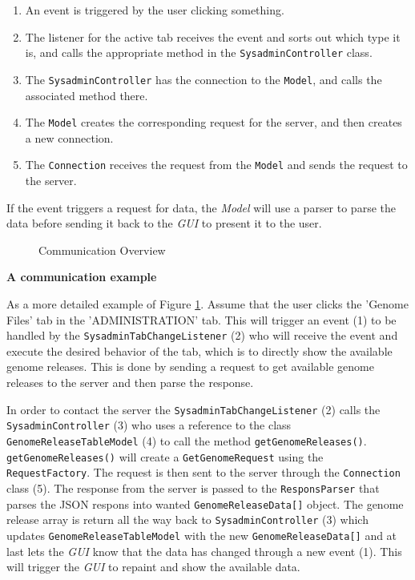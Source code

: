 \begin{enumerate}

  \item An event is triggered by the user clicking something.
  \item The listener for the active tab receives the event and sorts out which type it is, and calls the appropriate method in the \texttt{SysadminController} class.
  \item The \texttt{SysadminController} has the connection to the \texttt{Model}, and calls the associated method there.
  \item The \texttt{Model} creates the corresponding request for the server, and then creates a new connection.
  \item The \texttt{Connection} receives the request from the \texttt{Model} and sends the request to the server.


\end{enumerate}

If the event triggers a request for data, the \textit{Model} will use a parser to parse the data before sending it back to the \textit{GUI} to present it to the user.


\begin{figure}[hbt!]
\caption{\footnotesize Communication Overview}
\label{fig:adm_com_view}
\end{figure}

\textbf{A communication example}

As a more detailed example of Figure \ref{fig:adm_com_view}. Assume that the user clicks the 'Genome Files' tab in the 'ADMINISTRATION' tab. This will trigger an event (1) to be handled by the \texttt{SysadminTabChangeListener} (2) who will receive the event and execute the desired behavior of the tab, which is to directly show the available genome releases. This is done by sending a request to get available genome releases to the server and then parse the response. 

In order to contact the server the \texttt{SysadminTabChangeListener} (2) calls the \texttt{SysadminController} (3) who uses a reference to the class \texttt{GenomeReleaseTableModel} (4) to call the method \texttt{getGenomeReleases()}. \texttt{getGenomeReleases()} will create a \texttt{GetGenomeRequest} using the \texttt{RequestFactory}. The request is then sent to the server through the \texttt{Connection} class (5). The response from the server is passed to the \texttt{ResponsParser} that parses the JSON respons into wanted \texttt{GenomeReleaseData[]} object. The genome release array is return all the way back to \texttt{SysadminController} (3) which updates \texttt{GenomeReleaseTableModel} with the new \texttt{GenomeReleaseData[]} and at last lets the \textit{GUI} know that the data has changed through a new event (1). This will trigger the \textit{GUI} to repaint and show the available data.

